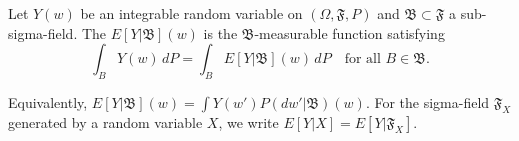 Let $Y(w)$ be an integrable random variable on $(\Omega, \mathfrak{F}, P)$ and $\mathfrak{B} \subset \mathfrak{F}$ a sub-sigma-field. The  $E[Y|\mathfrak{B}](w)$ is the $\mathfrak{B}$-measurable function satisfying
$$\int_B Y(w) \, dP = \int_B E[Y|\mathfrak{B}](w) \, dP \quad \text{for all } B \in \mathfrak{B}.$$

Equivalently, $E[Y|\mathfrak{B}](w) = \int Y(w') P(dw'|\mathfrak{B})(w)$. For the sigma-field $\mathfrak{F}_X$ generated by a random variable $X$, we write $E[Y|X] = E[Y|\mathfrak{F}_X]$.
